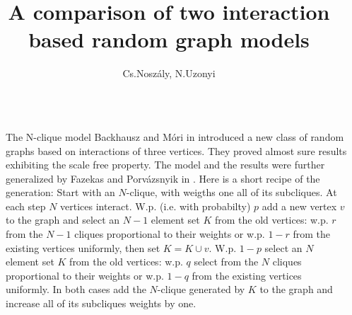 \documentclass[final]{beamer}
\title{A comparison of two interaction based random graph models} %
\author{Cs.Noszály, N.Uzonyi} %
\institute{Faculty of Informatics, University of Debrecen} %
\newlength{\sepwid}
\newlength{\onecolwid}
\newlength{\twocolwid}
\begin{document}

\setlength{\belowcaptionskip}{2ex} %
\setlength\belowdisplayshortskip{2ex} %

\begin{frame}[t] %

\begin{columns}[t] %

\begin{column}{\sepwid}\end{column} %


\begin{column}{\twocolwid} %

\begin{columns}[t,totalwidth=\twocolwid] %

\begin{column}{\onecolwid}\vspace{-.6in} %

\begin{block}{The N-clique model}\small
Backhausz and Móri in \cite{BaMo} introduced a new class of random graphs 
based on interactions of three vertices. They proved almost sure results 
exhibiting the scale free property. The model and the results were further 
generalized by Fazekas and Porvázsnyik in \cite{FaPo}. Here is a short recipe 
of the generation: Start with an $N$-clique, with weigths one all of its 
subcliques. At each step $N$ vertices interact. W.p. (i.e. with probabilty) 
$p$ add a new vertex $v$ to the graph and select an $N-1$ element set $K$ 
from the old vertices: w.p. $r$ from the $N-1$ cliques proportional to their
 weights or w.p. $1-r$ from the existing vertices uniformly, then set $K=K\cup{v}$. 
 W.p. $1-p$ select an $N$ element set $K$ from the old vertices: w.p. $q$ select 
 from the $N$ cliques proportional to their weights or w.p. $1-q$ from the existing 
 vertices uniformly. In both cases add the $N$-clique generated by $K$ to the graph 
 and increase all of its subcliques weights by one.


\end{block}
\end{column}
\end{columns}
\end{column}
\end{columns}
\end{frame}
\end{document}
